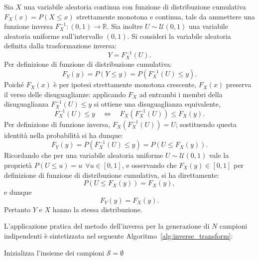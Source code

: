 Sia $X$ una variabile aleatoria continua con funzione di distribuzione cumulativa $F_X(x) = P(X \leq x)$ strettamente monotona e continua, tale da ammettere una funzione inversa $F_X^{-1}: (0,1) \to \mathbb{R}$. Sia inoltre $U \sim \mathcal{U}(0,1)$ una variabile aleatoria uniforme sull'intervallo $(0,1)$.
Si consideri la variabile aleatoria definita dalla trasformazione inversa:
\begin{equation}
Y = F_X^{-1}(U).
\end{equation} Per definizione di funzione di distribuzione cumulativa:
\begin{equation}
F_Y(y) = P(Y \leq y) = P\left(F_X^{-1}(U) \leq y\right).
\end{equation} Poiché $F_X(x)$ è per ipotesi strettamente monotona crescente, $F_X(x)$ preserva il verso delle disuguaglianze: applicando $F_X$ ad entrambi i membri della disuguaglianza $F_X^{-1}(U) \leq y$ si ottiene una disuguaglianza equivalente,
\begin{equation}
F_X^{-1}(U) \leq y \quad \Longleftrightarrow \quad F_X\!\left(F_X^{-1}(U)\right) \leq F_X(y).
\end{equation} Per definizione di funzione inversa, $F_X\!\left(F_X^{-1}(U)\right) = U$; sostituendo questa identità nella probabilità si ha dunque:
\begin{equation}
F_Y(y) = P\left(F_X^{-1}(U) \leq y\right) = P\left(U \leq F_X(y)\right).
\end{equation} Ricordando che per una variabile aleatoria uniforme $U \sim \mathcal{U}(0,1)$ vale la proprietà $P(U \leq u) = u \ \ \forall u \in [0, 1]$, e osservando che $F_X(y) \in [0,1]$ per definizione di funzione di distribuzione cumulativa, si ha direttamente:
\begin{equation}
P\left(U \leq F_X(y)\right) = F_X(y),
\end{equation} e dunque
\begin{equation}
F_Y(y) = F_X(y).
\end{equation} Pertanto $Y$ e $X$ hanno la stessa distribuzione.

L'applicazione pratica del metodo dell'inversa per la generazione di $N$ campioni indipendenti è sintetizzata nel seguente Algoritmo~\ref{alg:inverse_transform}:

\vspace{5mm}
\begin{algorithm}[H]
\SetAlgoLined
{}
    Inizializza l'insieme dei campioni $\mathcal{S} = \emptyset$\;
\caption{Metodo dell'Inversa}
\label{alg:inverse_transform}
\end{algorithm}
\vspace{5mm}

